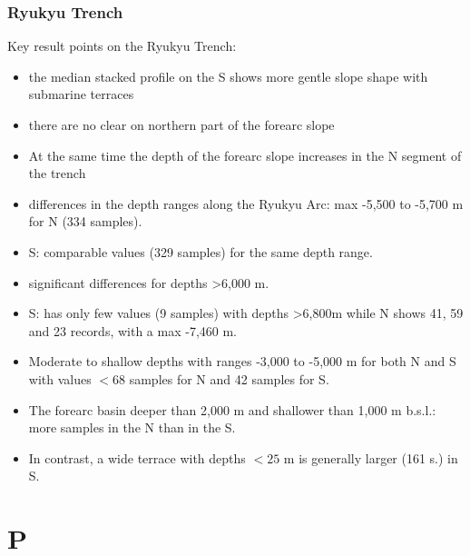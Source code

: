 \documentclass[pdflatex,compress,8pt,
	xcolor={dvipsnames,dvipsnames,svgnames,x11names,table},
	hyperref={colorlinks = true,breaklinks = true, urlcolor = NavyBlue, breaklinks = true}]{beamer}
\begin{document}
\begin{frame}\frametitle{Ryukyu Trench}
\vspace{2em}
Key result points on the Ryukyu Trench: 
\begin{itemize}
            \item the median stacked profile on the S shows more gentle slope shape with submarine terraces 
            \item there are no clear on northern part of the forearc slope
            \item At the same time the depth of the forearc slope increases in the N segment of the trench
            \item differences in the depth ranges along the Ryukyu Arc: max -5,500 to -5,700 m for N (334 samples).
            \item S: comparable values (329 samples) for the same depth range.
            \item significant differences for depths >6,000 m. 
            \item S: has only few values (9 samples) with depths >6,800m while N shows 41, 59 and 23 records, with a max -7,460 m. 
            \item Moderate to shallow depths with ranges -3,000 to -5,000 m for both N and S with values $< 68$ samples for N and 42 samples for S. 
            \item The forearc basin deeper than 2,000 m and shallower than 1,000 m b.s.l.: more samples in the N than in the S. 
            \item In contrast, a wide terrace with depths $<25$ m is generally larger (161 s.) in S. 
\end{itemize}	
\end{frame}

\section{P}
\end{document}

